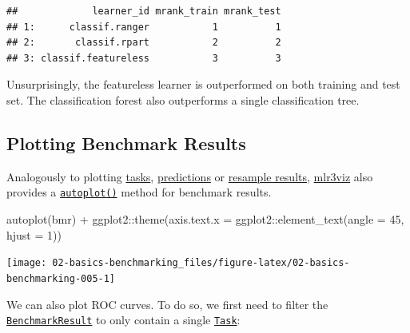 \documentclass[
]{scrbook}
\newenvironment{Shaded}{\begin{snugshade}}{\end{snugshade}}
\newcommand{\AttributeTok}[1]{\textcolor[rgb]{0.77,0.63,0.00}{#1}}
\newcommand{\DecValTok}[1]{\textcolor[rgb]{0.00,0.00,0.81}{#1}}
\newcommand{\FunctionTok}[1]{\textcolor[rgb]{0.00,0.00,0.00}{#1}}
\newcommand{\NormalTok}[1]{#1}
\newcommand{\OtherTok}[1]{\textcolor[rgb]{0.56,0.35,0.01}{#1}}
\newcommand{\SpecialCharTok}[1]{\textcolor[rgb]{0.00,0.00,0.00}{#1}}
\newcommand{\StringTok}[1]{\textcolor[rgb]{0.31,0.60,0.02}{#1}}
\renewenvironment{Shaded} {\begin{snugshade}\small} {\end{snugshade}}
\begin{document}
\begin{verbatim}
##             learner_id mrank_train mrank_test
## 1:      classif.ranger           1          1
## 2:       classif.rpart           2          2
## 3: classif.featureless           3          3
\end{verbatim}

Unsurprisingly, the featureless learner is outperformed on both training and test set.
The classification forest also outperforms a single classification tree.

\hypertarget{autoplot-benchmarkresult}{%
\subsection{Plotting Benchmark Results}\label{autoplot-benchmarkresult}}

Analogously to plotting \protect\hyperlink{autoplot-task}{tasks}, \protect\hyperlink{autoplot-prediction}{predictions} or \protect\hyperlink{autoplot-resampleresult}{resample results}, \href{https://mlr3viz.mlr-org.com}{mlr3viz} also provides a \href{https://www.rdocumentation.org/packages/ggplot2/topics/autoplot}{\texttt{autoplot()}} method for benchmark results.

\begin{Shaded}
\begin{Highlighting}[]
\FunctionTok{autoplot}\NormalTok{(bmr) }\SpecialCharTok{+}\NormalTok{ ggplot2}\SpecialCharTok{::}\FunctionTok{theme}\NormalTok{(}\AttributeTok{axis.text.x =}\NormalTok{ ggplot2}\SpecialCharTok{::}\FunctionTok{element\_text}\NormalTok{(}\AttributeTok{angle =} \DecValTok{45}\NormalTok{, }\AttributeTok{hjust =} \DecValTok{1}\NormalTok{))}
\end{Highlighting}
\end{Shaded}

\begin{center}\texttt{[image: 02-basics-benchmarking\_files/figure-latex/02-basics-benchmarking-005-1]} \end{center}

We can also plot ROC curves.
To do so, we first need to filter the \href{https://mlr3.mlr-org.com/reference/BenchmarkResult.html}{\texttt{BenchmarkResult}} to only contain a single \href{https://mlr3.mlr-org.com/reference/Task.html}{\texttt{Task}}:

\begin{Shaded}
\end{Shaded}
\end{document}
